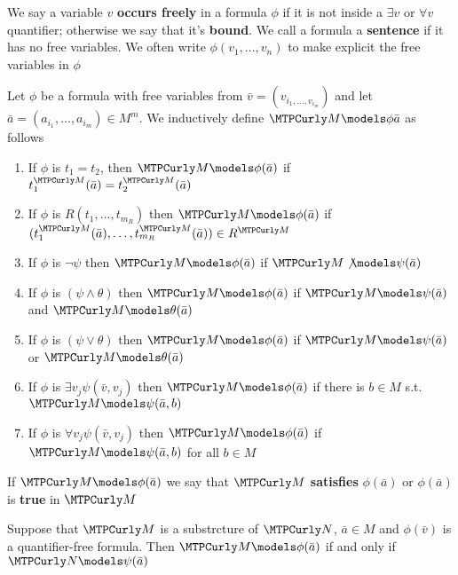 \documentclass[11pt]{article}
\begin{document}
We say a variable \(v\) \textbf{occurs freely} in a formula \(\phi\) if it is not
inside a \(\exists v\) or \(\forall v\) quantifier; otherwise we say that it's
\textbf{bound}. We call a formula a \textbf{sentence} if it has no free variables. We
often write \(\phi(v_1,\dots,v_n)\) to make explicit the free variables in \(\phi\)

\begin{definition}[]
Let \(\phi\) be a formula with free variables from
\(\bar{v}=(v_{i_1,\dots,v_{i_m}})\) and let \(\bar{a}=(a_{i_1},\dots,a_{i_m})\in
   M^m\). We inductively define \(\calm\models\phi\bar{a}\) as follows
\begin{enumerate}
\item If \(\phi\) is \(t_1=t_2\), then \(\calm\models\phi(\bar{a})\) if
\(t_1^\calm(\bar{a})=t_2^\calm(\bar{a})\)
\item If \(\phi\) is \(R(t_1,\dots,t_{m_R})\) then \(\calm\models\phi(\bar{a})\) if
\((t_1^\calm(\bar{a}),\dots,t_{m_R}^\calm(\bar{a}))\in R^\calm\)
\item If \(\phi\) is \(\neg\psi\) then \(\calm\models\phi(\bar{a})\) if
\(\calm\not\models\psi(\bar{a})\)
\item If \(\phi\) is \((\psi\wedge\theta)\) then \(\calm\models\phi(\bar{a})\) if
\(\calm\models\psi(\bar{a})\) and
\(\calm\models\theta(\bar{a})\)
\item If \(\phi\) is \((\psi\vee\theta)\) then \(\calm\models\phi(\bar{a})\) if
\(\calm\models\psi(\bar{a})\) or
\(\calm\models\theta(\bar{a})\)
\item If \(\phi\) is \(\exists v_j\psi(\bar{v},v_j)\) then \(\calm\models\phi(\bar{a})\)
if there is \(b\in M\) s.t. \(\calm\models\psi(\bar{a},b)\)
\item If \(\phi\) is \(\forall v_j\psi(\bar{v},v_j)\) then \(\calm\models\phi(\bar{a})\)
if \(\calm\models\psi(\bar{a},b)\) for all \(b\in M\)
\end{enumerate}
\end{definition}


If \(\calm\models\phi(\bar{a})\) we say that \(\calm\) \textbf{satisfies}
\(\phi(\bar{a})\) or \(\phi(\bar{a})\) is \textbf{true} in \(\calm\)

\begin{proposition}[]
\label{prop1.1.8}
Suppose that \(\calm\) is a substrcture of \(\caln\), \(\bar{a}\in M\) and
\(\phi(\bar{v})\) is a quantifier-free formula. Then
\(\calm\models\phi(\bar{a})\) if and only if \(\caln\models\psi(\bar{a})\)
\end{proposition}
\end{document}
